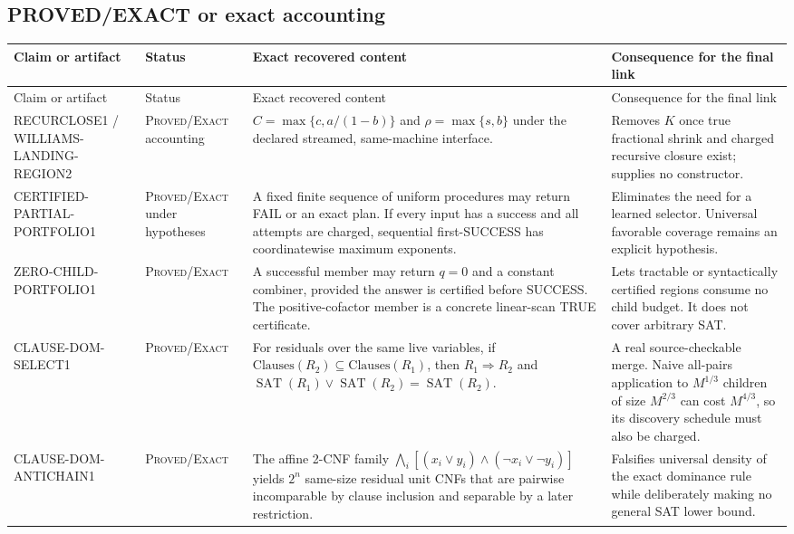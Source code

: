 \documentclass[10pt]{article}
\newcommand{\SAT}{\operatorname{SAT}}
\newcommand{\Exact}{\textsc{Proved/Exact}}
\begin{document}
\subsection*{PROVED/EXACT or exact accounting}
\small
\begin{longtable}{L{0.20\textwidth}L{0.18\textwidth}L{0.27\textwidth}L{0.29\textwidth}}
\toprule
Claim or artifact & Status & Exact recovered content & Consequence for the final link \\
\midrule
\endfirsthead
\toprule
Claim or artifact & Status & Exact recovered content & Consequence for the final link \\
\midrule
\endhead
\bottomrule
\endfoot

RECURCLOSE1 / WILLIAMS-LANDING-REGION2 & \Exact{} accounting &
$C=\max\{c,a/(1-b)\}$ and $\rho=\max\{s,b\}$ under the declared streamed,
same-machine interface. & Removes $K$ once true fractional shrink and charged
recursive closure exist; supplies no constructor. \\

CERTIFIED-PARTIAL-PORTFOLIO1 & \Exact{} under hypotheses &
A fixed finite sequence of uniform procedures may return FAIL or an exact
plan.  If every input has a success and all attempts are charged, sequential
first-SUCCESS has coordinatewise maximum exponents. & Eliminates the need for
a learned selector.  Universal favorable coverage remains an explicit
hypothesis. \\

ZERO-CHILD-PORTFOLIO1 & \Exact{} &
A successful member may return $q=0$ and a constant combiner, provided the
answer is certified before SUCCESS.  The positive-cofactor member is a
concrete linear-scan TRUE certificate. & Lets tractable or syntactically
certified regions consume no child budget.  It does not cover arbitrary SAT. \\

CLAUSE-DOM-SELECT1 & \Exact{} &
For residuals over the same live variables, if
$\mathrm{Clauses}(R_2)\subseteq\mathrm{Clauses}(R_1)$, then $R_1\Rightarrow
R_2$ and $\SAT(R_1)\lor\SAT(R_2)=\SAT(R_2)$. & A real source-checkable merge.
Naive all-pairs application to $M^{1/3}$ children of size $M^{2/3}$ can cost
$M^{4/3}$, so its discovery schedule must also be charged. \\

CLAUSE-DOM-ANTICHAIN1 & \Exact{} &
The affine 2-CNF family
$\bigwedge_i[(x_i\lor y_i)\wedge(\neg x_i\lor\neg y_i)]$ yields $2^n$
same-size residual unit CNFs that are pairwise incomparable by clause
inclusion and separable by a later restriction. & Falsifies universal density
of the exact dominance rule while deliberately making no general SAT lower
bound. \\


\end{longtable}
\end{document}
